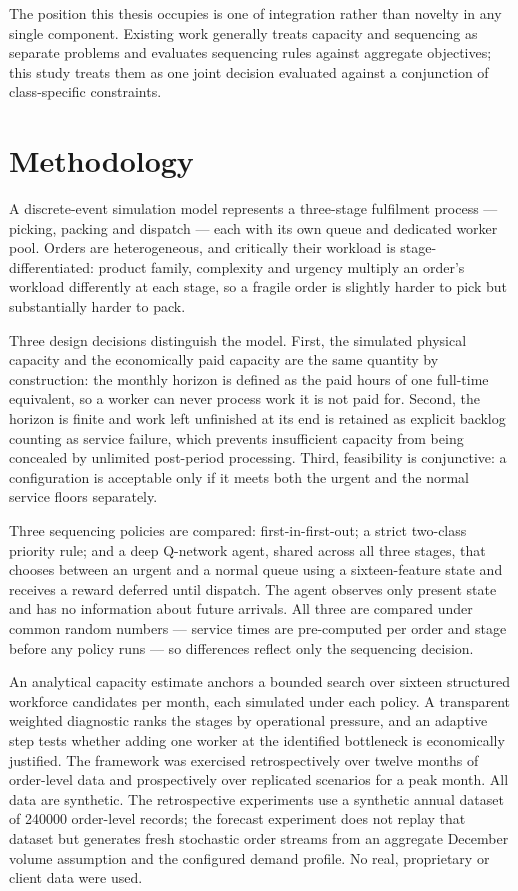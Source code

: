 The position this thesis occupies is one of integration rather than novelty in any single
component. Existing work generally treats capacity and sequencing as separate problems and
evaluates sequencing rules against aggregate objectives; this study treats them as one joint
decision evaluated against a conjunction of class-specific constraints.

\section*{Methodology}

A discrete-event simulation model represents a three-stage fulfilment process --- picking,
packing and dispatch --- each with its own queue and dedicated worker pool. Orders are
heterogeneous, and critically their workload is stage-differentiated: product family,
complexity and urgency multiply an order's workload differently at each stage, so a fragile
order is slightly harder to pick but substantially harder to pack.

Three design decisions distinguish the model. First, the simulated physical capacity and the
economically paid capacity are the same quantity by construction: the monthly horizon is
defined as the paid hours of one full-time equivalent, so a worker can never process work it is
not paid for. Second, the horizon is finite and work left unfinished at its end is retained as
explicit backlog counting as service failure, which prevents insufficient capacity from being
concealed by unlimited post-period processing. Third, feasibility is conjunctive: a
configuration is acceptable only if it meets both the urgent and the normal service floors
separately.

Three sequencing policies are compared: first-in-first-out; a strict two-class priority rule;
and a deep Q-network agent, shared across all three stages, that chooses between an urgent and a
normal queue using a sixteen-feature state and receives a reward deferred until dispatch. The
agent observes only present state and has no information about future arrivals. All three are
compared under common random numbers --- service times are pre-computed per order and stage
before any policy runs --- so differences reflect only the sequencing decision.

An analytical capacity estimate anchors a bounded search over sixteen structured workforce
candidates per month, each simulated under each policy. A transparent weighted diagnostic ranks
the stages by operational pressure, and an adaptive step tests whether adding one worker at the
identified bottleneck is economically justified. The framework was exercised retrospectively
over twelve months of order-level data and prospectively over replicated scenarios for a peak
month. All data are synthetic. The retrospective experiments use a synthetic annual dataset of
\num{240000} order-level records; the forecast experiment does not replay that dataset but
generates fresh stochastic order streams from an aggregate December volume assumption and the
configured demand profile. No real, proprietary or client data were used.

